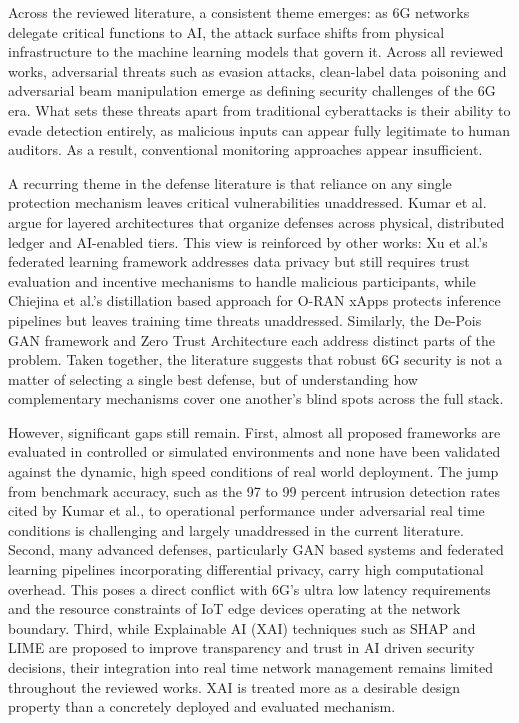\documentclass[letterpaper]{article} %
\begin{document}
Across the reviewed literature, a consistent theme emerges: as 6G networks delegate critical functions to AI, the attack surface shifts from physical infrastructure to the machine learning models that govern it. Across all reviewed works, adversarial threats such as evasion attacks, clean-label data poisoning and adversarial beam manipulation emerge as defining security challenges of the 6G era. What sets these threats apart from traditional cyberattacks is their ability to evade detection entirely, as malicious inputs can appear fully legitimate to human auditors. As a result, conventional monitoring approaches appear insufficient.

A recurring theme in the defense literature is that reliance on any single protection mechanism leaves critical vulnerabilities unaddressed. Kumar et al. argue for layered architectures that organize defenses across physical, distributed ledger and AI-enabled tiers. This view is reinforced by other works: Xu et al.'s federated learning framework addresses data privacy but still requires trust evaluation and incentive mechanisms to handle malicious participants, while Chiejina et al.'s distillation based approach for O-RAN xApps protects inference pipelines but leaves training time threats unaddressed. Similarly, the De-Pois GAN framework and Zero Trust Architecture each address distinct parts of the problem. Taken together, the literature suggests that robust 6G security is not a matter of selecting a single best defense, but of understanding how complementary mechanisms cover one another's blind spots across the full stack.

However, significant gaps still remain. First, almost all proposed frameworks are evaluated in controlled or simulated environments and none have been validated against the dynamic, high speed conditions of real world deployment. The jump from benchmark accuracy, such as the 97 to 99 percent intrusion detection rates cited by Kumar et al., to operational performance under adversarial real time conditions is challenging and largely unaddressed in the current literature. Second, many advanced defenses, particularly GAN based systems and federated learning pipelines incorporating differential privacy, carry high computational overhead. This poses a direct conflict with 6G's ultra low latency requirements and the resource constraints of IoT edge devices operating at the network boundary. Third, while Explainable AI (XAI) techniques such as SHAP and LIME are proposed to improve transparency and trust in AI driven security decisions, their integration into real time network management remains limited throughout the reviewed works. XAI is treated more as a desirable design property than a concretely deployed and evaluated mechanism.
\end{document}

